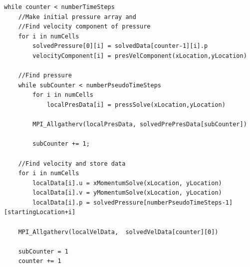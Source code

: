 \documentclass[12pt]{article}
\begin{document}
\begin{lstlisting}
while counter < numberTimeSteps
	//Make initial pressure array and 
	//Find velocity component of pressure
	for i in numCells
		solvedPressure[0][i] = solvedData[counter-1][i].p
		velocityComponent[i] = presVelComponent(xLocation,yLocation)
	
	//Find pressure
	while subCounter < numberPseudoTimeSteps
		for i in numCells
			localPresData[i] = pressSolve(xLocation,yLocation)

		MPI_Allgatherv(localPresData, solvedPrePresData[subCounter])

		subCounter += 1;

	//Find velocity and store data
	for i in numCells
		localData[i].u = xMomentumSolve(xLocation, yLocation)
		localData[i].v = yMomentumSolve(xLocation, yLocation)
		localData[i].p = solvedPressure[numberPseudoTimeSteps-1][startingLocation+i]

	MPI_Allgatherv(localVelData,  solvedVelData[counter][0])

	subCounter = 1
	counter += 1
\end{lstlisting}
\end{document}
